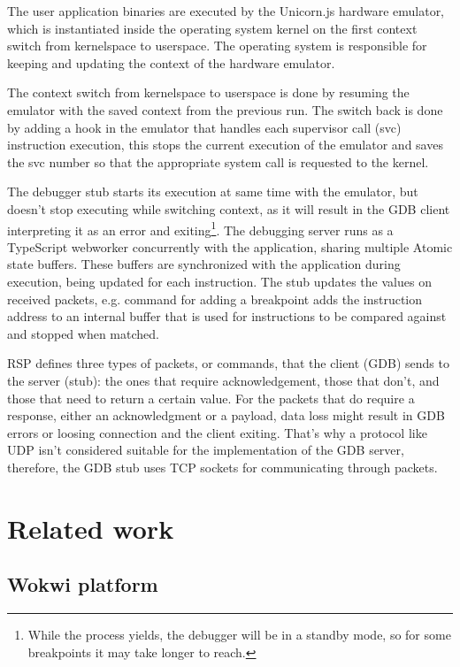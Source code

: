 \documentclass[12pt,a4paper]{report}
\begin{document}
The user application binaries are executed by the Unicorn.js hardware emulator, which is instantiated inside the operating system kernel on the first context switch from kernelspace to userspace. The operating system is responsible for keeping and updating the context of the hardware emulator.

The context switch from kernelspace to userspace is done by resuming the emulator with the saved context from the previous run. The switch back is done by adding a hook in the emulator that handles each supervisor call (svc) instruction execution, this stops the current execution of the emulator and saves the svc number so that the appropriate system call is requested to the kernel.

The debugger stub starts its execution at same time with the emulator, but doesn't stop executing while switching context, as it will result in the GDB client interpreting it as an error and exiting\footnote{While the process yields, the debugger will be in a standby mode, so for some breakpoints it may take longer to reach.}. The debugging server runs as a TypeScript webworker concurrently with the application, sharing multiple Atomic state buffers. These buffers are synchronized with the application during execution, being updated for each instruction. The stub updates the values on received packets, e.g. command for adding a breakpoint adds the instruction address to an internal buffer that is used for instructions to be compared against and stopped when matched.

RSP defines three types of packets, or commands, that the client (GDB) sends to the server (stub): the ones that require acknowledgement, those that don't, and those that need to return a certain value. For the packets that do require a response, either an acknowledgment or a payload, data loss might result in GDB errors or loosing connection and the client exiting. That's why a protocol like UDP isn't considered suitable for the implementation of the GDB server, therefore, the GDB stub uses TCP sockets for communicating through packets.

\chapter{Related work}

\section{Wokwi platform}
\end{document}
